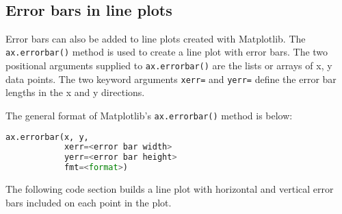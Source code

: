\documentclass{book}
\newcommand{\passthrough}[1]{#1}
\begin{document}
    \begin{center}
    \end{center}
    { \hspace*{\fill} \\}
    

    
        \hypertarget{error-bars-in-line-plots}{%
\subsection{Error bars in line plots}\label{error-bars-in-line-plots}}
    




    
        Error bars can also be added to line plots created with Matplotlib. The
\passthrough{\lstinline!ax.errorbar()!} method is used to create a line
plot with error bars. The two positional arguments supplied to
\passthrough{\lstinline!ax.errorbar()!} are the lists or arrays of x, y
data points. The two keyword arguments \passthrough{\lstinline!xerr=!}
and \passthrough{\lstinline!yerr=!} define the error bar lengths in the
x and y directions.

The general format of Matplotlib's
\passthrough{\lstinline!ax.errorbar()!} method is below:

\begin{lstlisting}[language=Python]
ax.errorbar(x, y,
            xerr=<error bar width>
            yerr=<error bar height>
            fmt=<format>)
\end{lstlisting}

The following code section builds a line plot with horizontal and
vertical error bars included on each point in the plot.
    
\end{document}
